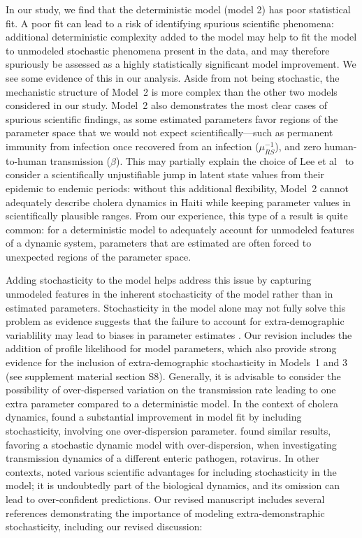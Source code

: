 \documentclass[11pt]{article}
\newcommand\muRS{\mu_{RS}}
\newcommand\transmission{\beta}
\begin{document}
In our study, we find that the deterministic model (model 2) has poor statistical fit.
A poor fit can lead to a risk of identifying spurious scientific phenomena: additional deterministic complexity added to the model may help to fit the model to unmodeled stochastic phenomena present in the data, and may therefore spuriously be assessed as a highly statistically significant model improvement.
We see some evidence of this in our analysis.
Aside from not being stochastic, the mechanistic structure of Model~2 is more complex than the other two models considered in our study.
Model~2 also demonstrates the most clear cases of spurious scientific findings, as some estimated parameters favor regions of the parameter space that we would not expect scientifically---such as permanent immunity from infection once recovered from an infection ($\muRS^{-1}$), and zero human-to-human transmission ($\transmission$).
This may partially explain the choice of Lee et al~\cite{lee20} to consider a scientifically unjustifiable jump in latent state values from their epidemic to endemic periods: without this additional flexibility, Model~2 cannot adequately describe cholera dynamics in Haiti while keeping parameter values in scientifically plausible ranges.
From our experience, this type of a result is quite common: for a deterministic model to adequately account for unmodeled features of a dynamic system, parameters that are estimated are often forced to unexpected regions of the parameter space.

Adding stochasticity to the model helps address this issue by capturing unmodeled features in the inherent stochasticity of the model rather than in estimated parameters.
Stochasticity in the model alone may not fully solve this problem as evidence suggests that the failure to account for extra-demographic variablility may lead to biases in parameter estimates \cite{he10}.
Our revision includes the addition of profile likelihood for model parameters, which also provide strong evidence for the inclusion of extra-demographic stochasticity in Models~1 and 3 (see supplement material section S8).
Generally, it is advisable to consider the possibility of over-dispersed variation on the transmission rate \cite{breto09,he10} leading to one extra parameter compared to a deterministic model.
In the context of cholera dynamics, \cite{lemaitre19} found a substantial improvement in model fit by including stochasticity, involving one over-dispersion parameter.
\cite{stocks20} found similar results, favoring a stochastic dynamic model with over-dispersion, when investigating transmission dynamics of a different enteric pathogen, rotavirus.
In other contexts, \cite{king15} noted various scientific advantages for including stochasticity in the model; it is undoubtedly part of the biological dynamics, and its omission can lead to over-confident predictions.
Our revised manuscript includes several references demonstrating the importance of modeling extra-demonstraphic stochasticity, including our revised discussion:
\end{document}
